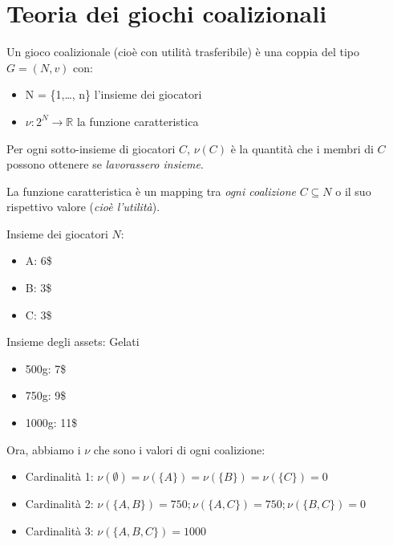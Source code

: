 \section{Teoria dei giochi coalizionali}

\begin{definition}

\end{definition}
Un gioco coalizionale (cioè con utilità trasferibile) è una coppia
del tipo $G = (N,v)$ con:
\begin{itemize}
    \item N = \{1,\dots, n\} l'insieme dei giocatori
    \item $\nu: 2^N \rightarrow \mathbb{R}$ la funzione caratteristica
\end{itemize}

Per ogni sotto-insieme di giocatori $C$, $\nu(C)$ è la quantità che i membri di
$C$ possono ottenere se \textit{lavorassero insieme}.

\begin{definition}
\end{definition}

La funzione caratteristica è un mapping tra \textit{ogni coalizione} $C
    \subseteq N$ o il suo rispettivo valore (\textit{cioè l'utilità}).

\begin{esempio}[Gelati]
\end{esempio}

Insieme dei giocatori $N$:
\begin{itemize}
    \item A: 6\$
    \item B: 3\$
    \item C: 3\$
\end{itemize}

Insieme degli assets: Gelati
\begin{itemize}
    \item 500g: 7\$
    \item 750g: 9\$
    \item 1000g: 11\$
\end{itemize}

Ora, abbiamo i $\nu$ che sono i valori di ogni coalizione:

\begin{itemize}
    \item Cardinalità 1: $\nu(\emptyset) = \nu(\{A\}) = \nu(\{B\}) = \nu(\{C\}) = 0$
    \item Cardinalità 2: $\nu(\{A,B\}) = 750; \nu(\{A,C\}) = 750; \nu(\{B,C\}) = 0$
    \item Cardinalità 3: $\nu(\{A,B,C\}) = 1000$
\end{itemize}

